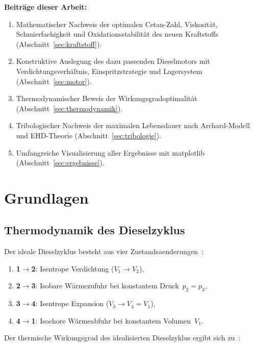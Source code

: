 ﻿\documentclass[12pt,a4paper]{article}
\begin{document}
\textbf{Beiträge dieser Arbeit:}
\begin{enumerate}[label=(\roman*)]
  \item Mathematischer Nachweis der optimalen Cetan-Zahl, Viskosität,
        Schmierfaehigkeit und Oxidationsstabilität des neuen Kraftstoffs
        (Abschnitt~\ref{sec:kraftstoff}).
  \item Konstruktive Auslegung des dazu passenden Dieselmotors mit
        Verdichtungsverhältnis, Einspritzstrategie und Lagersystem
        (Abschnitt~\ref{sec:motor}).
  \item Thermodynamischer Beweis der Wirkungsgradoptimalität
        (Abschnitt~\ref{sec:thermodynamik}).
  \item Tribologischer Nachweis der maximalen Lebensdauer nach Archard-Modell
        und EHD-Theorie (Abschnitt~\ref{sec:tribologie}).
  \item Umfangreiche Visualisierung aller Ergebnisse mit matplotlib
        (Abschnitt~\ref{sec:ergebnisse}).
\end{enumerate}

\section{Grundlagen}
\label{sec:grundlagen}

\subsection{Thermodynamik des Dieselzyklus}
\label{sec:grundlagen_thermo}

Der ideale Dieselzyklus besteht aus vier Zustandsaenderungen~\cite{merker2014}:

\begin{enumerate}
  \item \textbf{1$\to$2}: Isentrope Verdichtung ($V_1 \to V_2$),
  \item \textbf{2$\to$3}: Isobare Wärmezufuhr bei konstantem Druck~$p_2 = p_3$,
  \item \textbf{3$\to$4}: Isentrope Expansion ($V_3 \to V_4 = V_1$),
  \item \textbf{4$\to$1}: Isochore Wärmeabfuhr bei konstantem Volumen~$V_1$.
\end{enumerate}

Der thermische Wirkungsgrad des idealisierten Dieselzyklus ergibt sich zu~\cite{cengel2014}:
\end{document}
